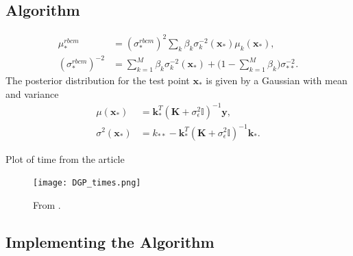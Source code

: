 \documentclass[twoside,english]{uiofysmaster}
\begin{document}
\subsection{Algorithm}

\begin{align}
\mu_*^{rbcm} &= (\sigma_*^{rbcm})^2 \sum_k \beta_k \sigma_k^{-2} (\textbf{x}_*) \mu_k (\textbf{x}_*),\\
(\sigma_*^{rbcm})^{-2} &= \sum_{k=1}^M \beta_k \sigma_k^{-2} (\textbf{x}_*) + \big(1 - \sum_{k=1}^M \beta_k \big) \sigma_{**}^{-2}.
\end{align}
The posterior distribution for the test point $\textbf{x}_*$ is given by a Gaussian with mean and variance
\begin{align}
\mu (\textbf{x}_*) &= \textbf{k}_*^T (\textbf{K} + \sigma_{\epsilon}^2 \mathbb{I})^{-1} \textbf{y},\\
\sigma^2(\textbf{x}_*) &= k_{**} - \textbf{k}_*^T(\textbf{K} + \sigma_{\epsilon}^2 \mathbb{I})^{-1} \textbf{k}_*.
\end{align}




Plot of time from the article 

\begin{figure}
\centering
\texttt{[image: DGP\_times.png]}
\caption{From \cite{deisenroth2015distributed}.}
\end{figure}

\subsection{Implementing the Algorithm}
\end{document}
